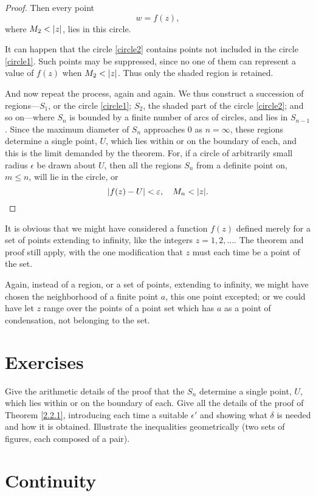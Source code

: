\documentclass[twosided]{memoir}
\begin{document}
\begin{proof}
Then every point
\[
	w=f(z)
,\] where $M_2<\abs*{z} $, lies in this circle. 

It can happen that the circle \ref{circle2} contains points not included in the circle \ref{circle1}. Such points may be suppressed, since no one of them can represent a value of $f(z)$ when $M_2<\abs*{z} $. Thus only the shaded region is retained.

And now repeat the process, again and again. We thus construct a succession of regions---$S_1$, or the circle \ref{circle1}; $S_2$, the shaded part of the circle \ref{circle2}; and so on---where $S_n$ is bounded by a finite number of arcs of circles, and lies in $S_{n-1} $. Since the maximum diameter of $S_n$ approaches $0$ as $n=\infty$, these regions determine a single point, $U$, which lies within or on the boundary of each, and this is the limit demanded by the theorem. For, if a circle of arbitrarily small radius $\epsilon$ be drawn about $U$, then all the regions $S_n$ from a definite point on, $m\le n$, will lie in the circle, or
\[
	\abs*{f(z)-U} <\epsilon, \quad M_n <  \abs*{z} 
.\] 
\end{proof} 

It is obvious that we might have considered a function $f(z)$ defined merely for a set of points extending to infinity, like the integers $z=1,2, \dots $. The theorem and proof still apply, with the one modification that $z$ must each time be a point of the set. 

Again, instead of a region, or a set of points, extending to infinity, we might have chosen the neighborhood of a finite point $a$, this one point excepted; or we could have let $z$ range over the points of a point set which has $a$ as a point of condensation, not belonging to the set.

\section*{Exercises}

\problem Give the arithmetic details of the proof that the $S_n$ determine a single point, $U$, which lies within or on the boundary of each.
\problem Give all the details of the proof of Theorem \ref{2.2.1}, introducing each time a suitable $\epsilon'$ and showing what $\delta $ is needed and how it is obtained. Illustrate the inequalities geometrically (two sets of figures, each composed of a pair).


\section{Continuity}
\end{document}

